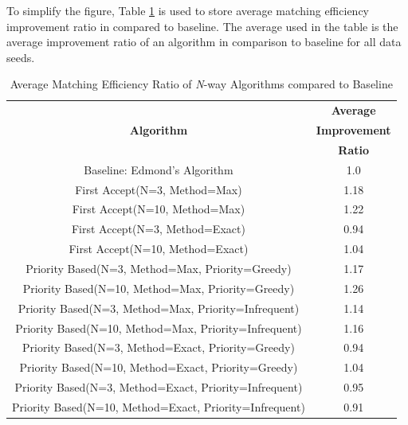 \documentclass[conference]{IEEEtran}
\begin{document}
To simplify the figure, Table \ref{tab2} is used to store average matching efficiency improvement ratio in compared to baseline. The average used
in the table is the average improvement ratio of an algorithm in comparison to baseline for all data seeds.

\begin{table}[htbp]
    \caption{Average Matching Efficiency Ratio of \textit{N}-way Algorithms compared to Baseline}
    \begin{center}
    \def\arraystretch{1.5}
    \begin{tabular}{|c|c|}
    \hline
    \cellcolor{tableheader}&\cellcolor{tableheader}\textbf{Average} \\
    \cellcolor{tableheader}\textbf{Algorithm}&\cellcolor{tableheader}\textbf{Improvement}\\
    \cellcolor{tableheader}&\cellcolor{tableheader}\textbf{Ratio}\\
    \hline
    Baseline: Edmond's Algorithm&1.0 \\
    \hline
    First Accept(N=3, Method=Max)&\cellcolor{moreratio}1.18 \\
    \hline
    First Accept(N=10, Method=Max)&\cellcolor{moreratio}1.22 \\
    \hline
    First Accept(N=3, Method=Exact)&\cellcolor{lessratio}0.94 \\
    \hline
    First Accept(N=10, Method=Exact)&\cellcolor{moreratio}1.04 \\
    \hline
    Priority Based(N=3, Method=Max, Priority=Greedy)&\cellcolor{moreratio}1.17 \\
    \hline
    Priority Based(N=10, Method=Max, Priority=Greedy)&\cellcolor{moreratio}1.26 \\
    \hline
    Priority Based(N=3, Method=Max, Priority=Infrequent)&\cellcolor{moreratio}1.14 \\
    \hline
    Priority Based(N=10, Method=Max, Priority=Infrequent)&\cellcolor{moreratio}1.16 \\
    \hline
    Priority Based(N=3, Method=Exact, Priority=Greedy)&\cellcolor{lessratio}0.94 \\
    \hline
    Priority Based(N=10, Method=Exact, Priority=Greedy)&\cellcolor{moreratio}1.04 \\
    \hline
    Priority Based(N=3, Method=Exact, Priority=Infrequent)&\cellcolor{lessratio}0.95 \\
    \hline
    Priority Based(N=10, Method=Exact, Priority=Infrequent)&\cellcolor{lessratio}0.91 \\
    \hline
    \end{tabular}
    \label{tab2}
    \end{center}
\end{table}
\end{document}
